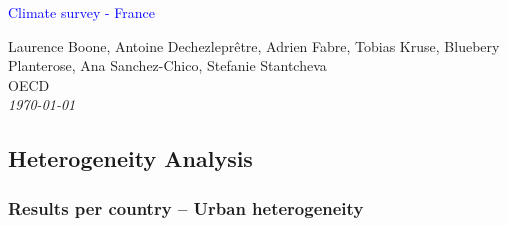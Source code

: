 



%
              





\begin{frame}
\thispagestyle{empty}
\begin{center}
\begin{LARGE}
\textcolor{blue}{Climate survey - France}
\end{LARGE}

\vspace{1cm}


Laurence Boone, Antoine Dechezleprêtre, Adrien Fabre, Tobias Kruse, Bluebery Planterose, Ana Sanchez-Chico, Stefanie Stantcheva \\

OECD \\

\textit{\today} 

\end{center}

\bigskip

\end{frame}

\subsection{Heterogeneity Analysis}


\subsubsection{Results per country -- Urban heterogeneity}


